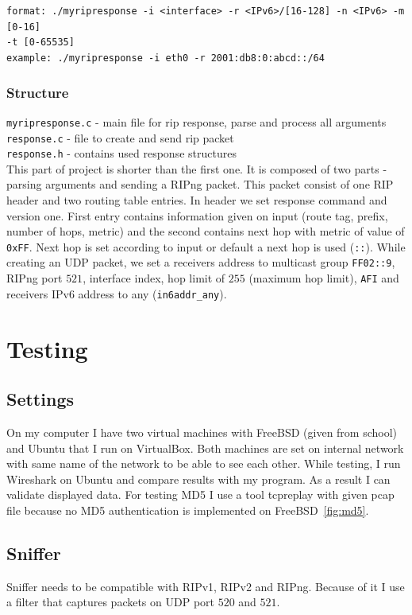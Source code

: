 \documentclass[11pt,a4paper]{article}
\begin{document}
\noindent
\texttt{format: ./myripresponse -i <interface> -r <IPv6>/[16-128] {-n <IPv6>} {-m [0-16]} \\{-t [0-65535]}} \\
\texttt{example: ./myripresponse -i eth0 -r 2001:db8:0:abcd::/64 }\\

\subsubsection{Structure}
\texttt{myripresponse.c} - main file for rip response, parse and process all arguments\\
\texttt{response.c} - file to create and send rip packet\\
\texttt{response.h} - contains used response structures\\

\noindent
This part of project is shorter than the first one. It is composed of two parts - parsing arguments and sending a RIPng packet. This packet consist of one RIP header and two routing table entries. In header we set response command and version one. First entry contains information given on input (route tag, prefix, number of hops, metric) and the second contains next hop with metric of value of \texttt{0xFF}\cite{ripng}. Next hop is set according to input or default a next hop is used (\texttt{::}).
\noindent
While creating an UDP packet, we set a receivers address to multicast group \texttt{FF02::9}, RIPng port $521$, interface index, hop limit of $255$ (maximum hop limit), \texttt{AFI} and receivers IPv6 address to any (\texttt{in6addr\_any}).

\section{Testing}
\subsection{Settings}
On my computer I have two virtual machines with FreeBSD (given from school) and Ubuntu that I run on VirtualBox. Both machines are set on internal network with same name of the network to be able to see each other. While testing, I run Wireshark on Ubuntu and compare results with my program. As a result I can validate displayed data. For testing MD5 I use a tool tcpreplay with given pcap file because no MD5 authentication is implemented on FreeBSD~\ref{fig:md5}.   

\subsection{Sniffer}
\label{sec:sniffer}
Sniffer needs to be compatible with RIPv1, RIPv2 and RIPng. Because of it I use a filter that captures packets on UDP port $520$ and $521$.
\end{document}
